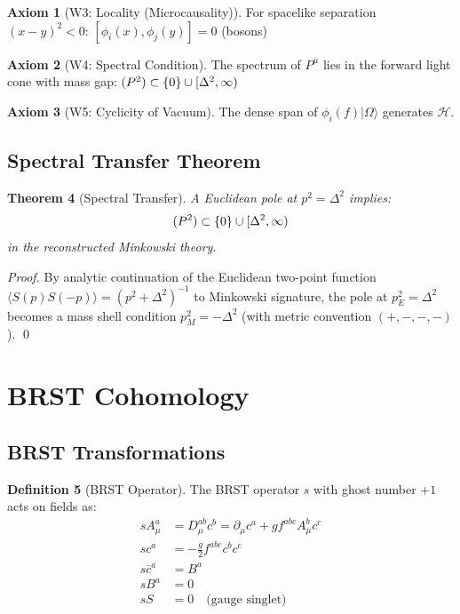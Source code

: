 \documentclass[11pt,a4paper]{article}
\providecommand{\Hilbert}{\mathcal{H}}
\let\spec\relax
\DeclareMathOperator{\spec}{spec}
\newcommand{\spec}{\mathrm{spec}}
\theoremstyle{plain}
\newtheorem{theorem}{Theorem}[section]
\theoremstyle{definition}
\newtheorem{definition}[theorem]{Definition}
\newtheorem{axiom}[theorem]{Axiom}
\begin{document}
\begin{axiom}[W3: Locality (Microcausality)]
For spacelike separation $(x-y)^2 < 0$: $[\phi_i(x), \phi_j(y)] = 0$ (bosons)
\end{axiom}
\vspace{0.3em} 
\begin{axiom}[W4: Spectral Condition]
The spectrum of $P^\mu$ lies in the forward light cone with mass gap: $\spec(P^2) \subset \{0\} \cup [\Delta^2, \infty)$
\end{axiom}
\vspace{0.3em} 
\begin{axiom}[W5: Cyclicity of Vacuum]
The dense span of $\phi_i(f)|\Omega\rangle$ generates $\Hilbert$.
\end{axiom}
\vspace{0.3em} 
\subsection{Spectral Transfer Theorem}

\begin{theorem}[Spectral Transfer]
\label{thm:spectral_transfer}
A Euclidean pole at $p^2 = \Delta^2$ implies:
\begin{equation}
\spec(P^2) \subset \{0\} \cup [\Delta^2, \infty)
\end{equation}
in the reconstructed Minkowski theory.
\end{theorem}

\begin{proof}
By analytic continuation of the Euclidean two-point function $\langle S(p) S(-p) \rangle = (p^2 + \Delta^2)^{-1}$ to Minkowski signature, the pole at $p_E^2 = \Delta^2$ becomes a mass shell condition $p_M^2 = -\Delta^2$ (with metric convention $(+,-,-,-)$). \qed
\end{proof}

\section{BRST Cohomology}
\label{sec:brst}

\subsection{BRST Transformations}

\begin{definition}[BRST Operator]
The BRST operator $s$ with ghost number $+1$ acts on fields as:
\begin{align}
s A^a_\mu &= D_\mu^{ab} c^b = \partial_\mu c^a + g f^{abc} A^b_\mu c^c \\
s c^a &= -\frac{g}{2} f^{abc} c^b c^c \\
s \bar{c}^a &= B^a \\
s B^a &= 0 \\
s S &= 0 \quad \text{(gauge singlet)}
\end{align}
\end{definition}
\end{document}
